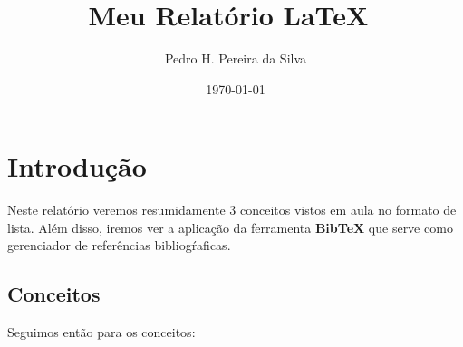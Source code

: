 \documentclass[12pt]{article}
\title{Meu Relatório \LaTeX\ }
\author{Pedro H. Pereira da Silva}
\date{\today}
\begin{document}
\maketitle

\section{Introdução}
Neste relatório veremos resumidamente 3 conceitos vistos em aula no formato de lista. Além disso, iremos ver a aplicação da ferramenta \textbf{BibTeX}  que serve como gerenciador de referências bibliogŕaficas.

    \subsection{Conceitos}
    Seguimos então para os conceitos:
\end{document}
